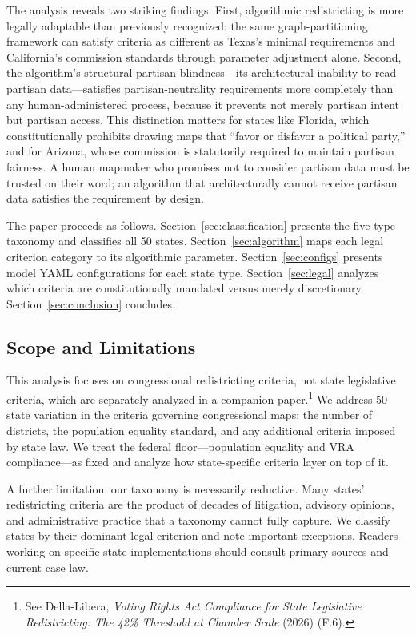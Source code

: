 The analysis reveals two striking findings. First, algorithmic redistricting is more legally adaptable than previously recognized: the same graph-partitioning framework can satisfy criteria as different as Texas's minimal requirements and California's commission standards through parameter adjustment alone. Second, the algorithm's structural partisan blindness---its architectural inability to read partisan data---satisfies partisan-neutrality requirements more completely than any human-administered process, because it prevents not merely partisan intent but partisan access. This distinction matters for states like Florida, which constitutionally prohibits drawing maps that ``favor or disfavor a political party,'' and for Arizona, whose commission is statutorily required to maintain partisan fairness. A human mapmaker who promises not to consider partisan data must be trusted on their word; an algorithm that architecturally cannot receive partisan data satisfies the requirement by design.

The paper proceeds as follows. Section~\ref{sec:classification} presents the five-type taxonomy and classifies all 50 states. Section~\ref{sec:algorithm} maps each legal criterion category to its algorithmic parameter. Section~\ref{sec:configs} presents model YAML configurations for each state type. Section~\ref{sec:legal} analyzes which criteria are constitutionally mandated versus merely discretionary. Section~\ref{sec:conclusion} concludes.

\subsection{Scope and Limitations}

This analysis focuses on congressional redistricting criteria, not state legislative criteria, which are separately analyzed in a companion paper.\footnote{See Della-Libera, \textit{Voting Rights Act Compliance for State Legislative Redistricting: The 42\% Threshold at Chamber Scale} (2026) (F.6).} We address 50-state variation in the criteria governing congressional maps: the number of districts, the population equality standard, and any additional criteria imposed by state law. We treat the federal floor---population equality and VRA compliance---as fixed and analyze how state-specific criteria layer on top of it.

A further limitation: our taxonomy is necessarily reductive. Many states' redistricting criteria are the product of decades of litigation, advisory opinions, and administrative practice that a taxonomy cannot fully capture. We classify states by their dominant legal criterion and note important exceptions. Readers working on specific state implementations should consult primary sources and current case law.
